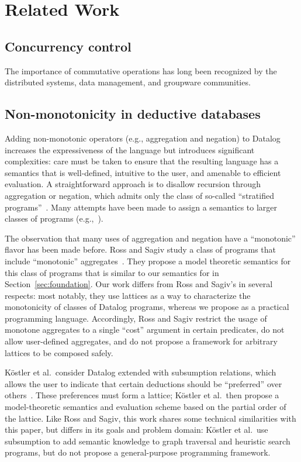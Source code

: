 \section{Related Work}

\subsection{Concurrency control}
The importance of commutative operations has long been recognized by the
distributed systems, data management, and groupware communities.


\subsection{Non-monotonicity in deductive databases}
Adding non-monotonic operators (e.g., aggregation and negation) to Datalog
increases the expressiveness of the language but introduces significant
complexities: care must be taken to ensure that the resulting language has a
semantics that is well-defined, intuitive to the user, and amenable to efficient
evaluation. A straightforward approach is to disallow recursion through
aggregation or negation, which admits only the class of so-called ``stratified
programs''~\cite{Apt1988}. Many attempts have been made to assign a semantics to
larger classes of programs (e.g.,~\cite{Gelfond1988,Ross1990,VanGelder1991}).

The observation that many uses of aggregation and negation have a ``monotonic''
flavor has been made before. Ross and Sagiv study a class of programs that
include ``monotonic'' aggregates~\cite{Ross1992}. They propose a model theoretic
semantics for this class of programs that is similar to our semantics for
\baselang in Section~\ref{sec:foundation}. Our work differs from Ross and
Sagiv's in several respects: most notably, they use lattices as a way to
characterize the monotonicity of classes of Datalog programs, whereas we propose
\lang as a practical programming language. Accordingly, Ross and Sagiv restrict
the usage of monotone aggregates to a single ``cost'' argument in certain
predicates, do not allow user-defined aggregates, and do not propose a framework
for arbitrary lattices to be composed safely.

K\"{o}stler et al.\ consider Datalog extended with subsumption relations, which
allows the user to indicate that certain deductions should be ``preferred'' over
others~\cite{Kostler1995}. These preferences must form a lattice; K\"{o}stler et
al.\ then propose a model-theoretic semantics and evaluation scheme based on the
partial order of the lattice. Like Ross and Sagiv, this work shares some
technical similarities with this paper, but differs in its goals and problem
domain: K\"{o}stler et al.\ use subsumption to add semantic knowledge to graph
traversal and heuristic search programs, but do not propose a general-purpose
programming framework.

